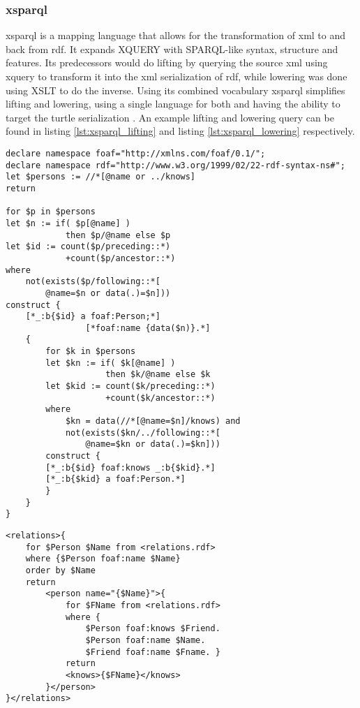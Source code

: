 \subsubsection{\acrshort*{xsparql}}
\acrshort{xsparql} is a mapping language that allows for the transformation of \acrshort{xml} to and back from \acrshort{rdf}. It expands XQUERY with SPARQL-like syntax, structure and features. Its predecessors would do lifting by querying the source \acrshort{xml} using \acrshort{xquery} to transform it into the \acrshort{xml} serialization of \acrshort{rdf}, while lowering was done using XSLT to do the inverse. Using its combined vocabulary \acrshort{xsparql} simplifies lifting and lowering, using a single language for both and having the ability to target the turtle serialization \citep{xsparql}. An example lifting and lowering query can be found in listing \ref{lst:xsparql_lifting} and listing \ref{lst:xsparql_lowering} respectively.

\begin{lstlisting}[caption={Example of \acrshort{xsparql} lifting}, label={lst:xsparql_lifting}, captionpos=b, basicstyle=\small, frame=single]
declare namespace foaf="http://xmlns.com/foaf/0.1/";
declare namespace rdf="http://www.w3.org/1999/02/22-rdf-syntax-ns#";
let $persons := //*[@name or ../knows]
return

for $p in $persons
let $n := if( $p[@name] )
            then $p/@name else $p
let $id := count($p/preceding::*)
            +count($p/ancestor::*)
where
    not(exists($p/following::*[
        @name=$n or data(.)=$n]))
construct {
    [*_:b{$id} a foaf:Person;*]
                [*foaf:name {data($n)}.*]
    {
        for $k in $persons
        let $kn := if( $k[@name] )
                    then $k/@name else $k
        let $kid := count($k/preceding::*)
                    +count($k/ancestor::*)
        where
            $kn = data(//*[@name=$n]/knows) and
            not(exists($kn/../following::*[
                @name=$kn or data(.)=$kn]))
        construct {
        [*_:b{$id} foaf:knows _:b{$kid}.*]
        [*_:b{$kid} a foaf:Person.*]
        }
    }
}
\end{lstlisting}

\begin{lstlisting}[caption={Example of \acrshort{xsparql} lowering}, label={lst:xsparql_lowering}, captionpos=b, basicstyle=\small, frame=single]
<relations>{
    for $Person $Name from <relations.rdf>
    where {$Person foaf:name $Name}
    order by $Name
    return
        <person name="{$Name}">{
            for $FName from <relations.rdf>
            where {
                $Person foaf:knows $Friend.
                $Person foaf:name $Name.
                $Friend foaf:name $Fname. }
            return
            <knows>{$FName}</knows>
        }</person>
}</relations>
\end{lstlisting}


